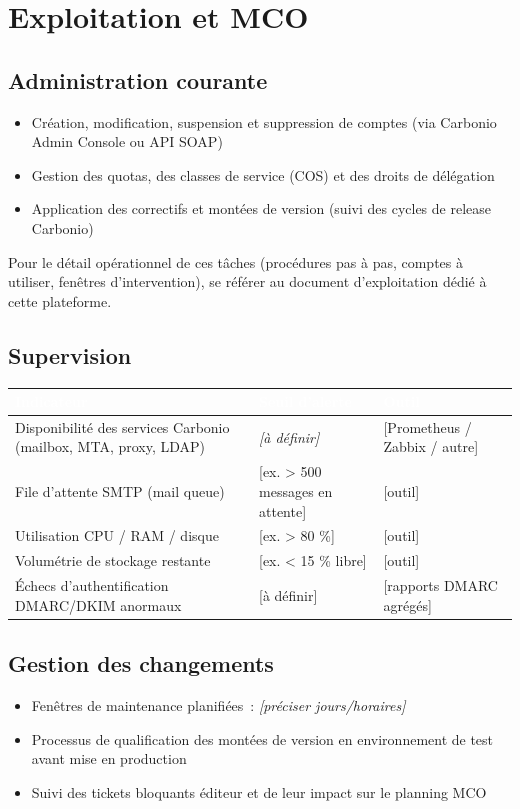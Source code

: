 \documentclass[11pt,a4paper]{report}
\newcommand{\placeholder}[1]{\textit{\textcolor{placeholdercol}{[#1]}}\par\vspace{4pt}}
\newcommand{\tblhead}[1]{\textcolor{white}{\textbf{#1}}}
\begin{document}
\chapter{Exploitation et MCO}

\section{Administration courante}
\begin{itemize}[nosep]
  \item Création, modification, suspension et suppression de comptes (via Carbonio Admin Console ou API SOAP)
  \item Gestion des quotas, des classes de service (COS) et des droits de délégation
  \item Application des correctifs et montées de version (suivi des cycles de release Carbonio)
\end{itemize}
Pour le détail opérationnel de ces tâches (procédures pas à pas, comptes à utiliser, fenêtres d'intervention), se référer au document d'exploitation dédié à cette plateforme.

\section{Supervision}
\begin{longtable}{|p{5cm}|p{4cm}|p{3.5cm}|}
\hline
\rowcolor{primary}\tblhead{Indicateur} & \tblhead{Seuil d'alerte} & \tblhead{Outil} \\
\hline
\endhead
Disponibilité des services Carbonio (mailbox, MTA, proxy, LDAP) & \placeholder{à définir} & [Prometheus / Zabbix / autre] \\
\hline
File d'attente SMTP (mail queue) & [ex. > 500 messages en attente] & [outil] \\
\hline
Utilisation CPU / RAM / disque & [ex. > 80 \%] & [outil] \\
\hline
Volumétrie de stockage restante & [ex. < 15 \% libre] & [outil] \\
\hline
Échecs d'authentification DMARC/DKIM anormaux & [à définir] & [rapports DMARC agrégés] \\
\hline
\end{longtable}

\section{Gestion des changements}
\begin{itemize}[nosep]
  \item Fenêtres de maintenance planifiées~: \placeholder{préciser jours/horaires}
  \item Processus de qualification des montées de version en environnement de test avant mise en production
  \item Suivi des tickets bloquants éditeur et de leur impact sur le planning MCO
\end{itemize}
\end{document}
